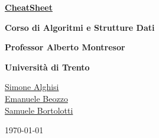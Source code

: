 \documentclass[12pt, a4paper, oneside]{book}
\begin{document}
\frontmatter
	\begin{titlepage}
		\begin{center}
		{\Huge \href{https://github.com/emanuelebeozzo/CheatSheetAlgoritmi}{\textbf{CheatSheet}} \par}
    		\vspace{0.5cm}
    		{\Large \textbf{Corso di Algoritmi e Strutture Dati} \par
    		\vspace{0.2cm}
			\textbf{Professor Alberto Montresor} \par
			\vspace{0.2cm}
			\textbf{Università di Trento} \par
			}
		\vspace*{\fill}
    		{\Large 
    		\faGithub \hspace{0.2em} \href{https://github.com/Simone-Alghisi}{Simone Alghisi}\\
    		\faGithub \hspace{0.2em} \href{https://github.com/emanuelebeozzo}{Emanuele Beozzo}\\
    		\faGithub \hspace{0.2em} \href{https://github.com/samuelebortolotti}{Samuele Bortolotti}
    		\par}
    		\vspace{0.5cm}
    		{\today}
		\end{center}
	\end{titlepage}
	
	\tableofcontents
	
	\lstlistoflistings
	
	\mainmatter
	
	
	
	
	
	
	
	
	
	
	
	
	
	
	
	
	
	
	
\end{document}
